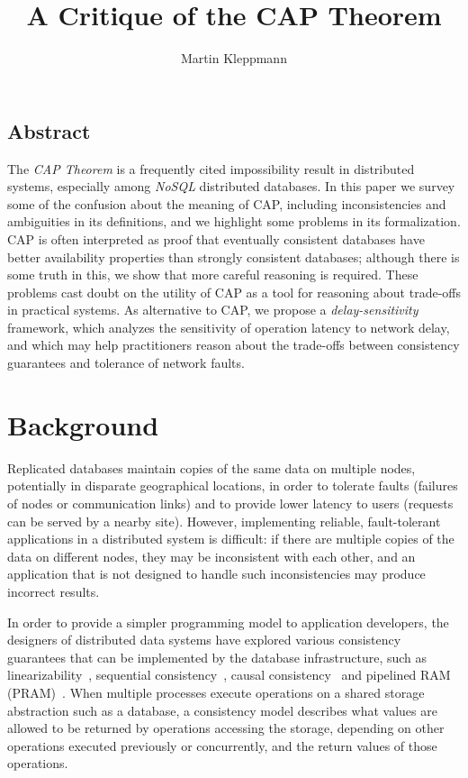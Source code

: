 \documentclass[a4paper,twocolumn,10pt]{article}
\begin{document}
\sloppy
\date{} %
\title{A Critique of the CAP Theorem}
\author{Martin Kleppmann}
\maketitle

\subsection*{Abstract}

The \emph{CAP Theorem} is a frequently cited impossibility result in distributed systems, especially
among \emph{NoSQL} distributed databases. In this paper we survey some of the confusion about the
meaning of CAP, including inconsistencies and ambiguities in its definitions, and we highlight some
problems in its formalization. CAP is often interpreted as proof that eventually consistent
databases have better availability properties than strongly consistent databases; although there is
some truth in this, we show that more careful reasoning is required. These problems cast doubt on
the utility of CAP as a tool for reasoning about trade-offs in practical systems. As alternative to
CAP, we propose a \emph{delay-sensitivity} framework, which analyzes the sensitivity of operation
latency to network delay, and which may help practitioners reason about the trade-offs between
consistency guarantees and tolerance of network faults.


\section{Background}

Replicated databases maintain copies of the same data on multiple nodes, potentially in disparate
geographical locations, in order to tolerate faults (failures of nodes or communication links) and
to provide lower latency to users (requests can be served by a nearby site). However, implementing
reliable, fault-tolerant applications in a distributed system is difficult: if there are multiple
copies of the data on different nodes, they may be inconsistent with each other, and an application
that is not designed to handle such inconsistencies may produce incorrect results.

In order to provide a simpler programming model to application developers, the designers of
distributed data systems have explored various consistency guarantees that can be implemented by the
database infrastructure, such as linearizability~\cite{Herlihy1990jq}, sequential
consistency~\cite{Lamport1979ky}, causal consistency~\cite{Ahamad1995gl} and pipelined RAM
(PRAM)~\cite{Lipton1988uh}. When multiple processes execute operations on a shared storage
abstraction such as a database, a consistency model describes what values are allowed to be returned
by operations accessing the storage, depending on other operations executed previously or
concurrently, and the return values of those operations.
\end{document}
